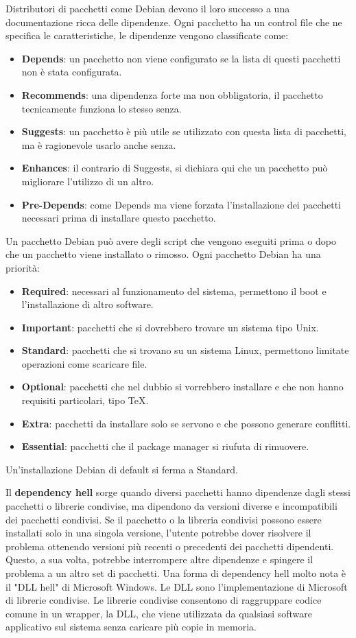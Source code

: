 \documentclass[a4paper,12pt,titlepage,oneside]{book}
\begin{document}
Distributori di pacchetti come Debian devono il loro successo a una documentazione ricca delle dipendenze. Ogni pacchetto ha un control file che ne specifica le caratteristiche, le dipendenze vengono 
classificate come:
\begin{itemize}
    \item \textbf{Depends}: un pacchetto non viene configurato se la lista di questi pacchetti non è stata configurata.
    \item \textbf{Recommends}: una dipendenza forte ma non obbligatoria, il pacchetto tecnicamente funziona lo stesso senza.
    \item \textbf{Suggests}: un pacchetto è più utile se utilizzato con questa lista di pacchetti, ma è ragionevole usarlo anche senza.
    \item \textbf{Enhances}: il contrario di Suggests, si dichiara qui che un pacchetto può migliorare l'utilizzo di un altro.
    \item \textbf{Pre-Depends}: come Depends ma viene forzata l'installazione dei pacchetti necessari prima di installare questo pacchetto.
\end{itemize}
Un pacchetto Debian può avere degli script che vengono eseguiti prima o dopo che un pacchetto viene installato o rimosso.
Ogni pacchetto Debian ha una priorità:
\begin{itemize}
    \item \textbf{Required}: necessari al funzionamento del sistema, permettono il boot e l'installazione di altro software.
    \item \textbf{Important}: pacchetti che si dovrebbero trovare un sistema tipo Unix.
    \item \textbf{Standard}: pacchetti che si trovano su un sistema Linux, permettono limitate operazioni come scaricare file.
    \item \textbf{Optional}: pacchetti che nel dubbio si vorrebbero installare e che non hanno requisiti particolari, tipo TeX.
    \item \textbf{Extra}: pacchetti da installare solo se servono e che possono generare conflitti.
    \item \textbf{Essential}: pacchetti che il package manager si riufuta di rimuovere.
\end{itemize}
Un'installazione Debian di default si ferma a Standard.

Il \textbf{dependency hell} sorge quando diversi pacchetti hanno dipendenze dagli stessi pacchetti o librerie condivise, ma dipendono da versioni diverse e incompatibili dei pacchetti condivisi. 
Se il pacchetto o la libreria condivisi possono essere installati solo in una singola versione, l'utente potrebbe dover risolvere il problema ottenendo versioni più recenti o precedenti dei pacchetti dipendenti. 
Questo, a sua volta, potrebbe interrompere altre dipendenze e spingere il problema a un altro set di pacchetti.
Una forma di dependency hell molto nota è il "DLL hell" di Microsoft Windows. Le DLL sono l'implementazione di Microsoft di librerie condivise. Le librerie condivise consentono di raggruppare codice comune in un wrapper, 
la DLL, che viene utilizzata da qualsiasi software applicativo sul sistema senza caricare più copie in memoria.
\end{document}

